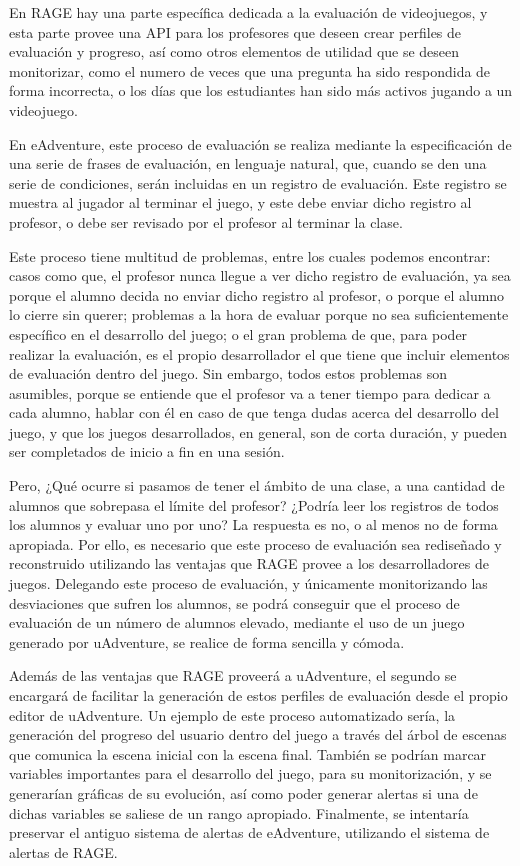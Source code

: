 En RAGE hay una parte específica dedicada a la evaluación de videojuegos, y esta parte provee una API para los profesores que deseen crear perfiles de evaluación y progreso, así como otros elementos de utilidad que se deseen monitorizar, como el numero de veces que una pregunta ha sido respondida de forma incorrecta, o los días que los estudiantes han sido más activos jugando a un videojuego.

En eAdventure, este proceso de evaluación se realiza mediante la especificación de una serie de frases de evaluación, en lenguaje natural, que, cuando se den una serie de condiciones, serán incluidas en un registro de evaluación. Este registro se muestra al jugador al terminar el juego, y este debe enviar dicho registro al profesor, o debe ser revisado por el profesor al terminar la clase.

Este proceso tiene multitud de problemas, entre los cuales podemos encontrar: casos como que, el profesor nunca llegue a ver dicho registro de evaluación, ya sea porque el alumno decida no enviar dicho registro al profesor, o porque el alumno lo cierre sin querer; problemas a la hora de evaluar porque no sea suficientemente específico en el desarrollo del juego; o el gran problema de que, para poder realizar la evaluación, es el propio desarrollador el que tiene que incluir elementos de evaluación dentro del juego. Sin embargo, todos estos problemas son asumibles, porque se entiende que el profesor va a tener tiempo para dedicar a cada alumno, hablar con él en caso de que tenga dudas acerca del desarrollo del juego, y que los juegos desarrollados, en general, son de corta duración, y pueden ser completados de inicio a fin en una sesión.

Pero, ¿Qué ocurre si pasamos de tener el ámbito de una clase, a una cantidad de alumnos que sobrepasa el límite del profesor? ¿Podría leer los registros de todos los alumnos y evaluar uno por uno? La respuesta es no, o al menos no de forma apropiada. Por ello, es necesario que este proceso de evaluación sea rediseñado y reconstruido utilizando las ventajas que RAGE provee a los desarrolladores de juegos. Delegando este proceso de evaluación, y únicamente monitorizando las desviaciones que sufren los alumnos, se podrá conseguir que el proceso de evaluación de un número de alumnos elevado, mediante el uso de un juego generado por uAdventure, se realice de forma sencilla y cómoda.

Además de las ventajas que RAGE proveerá a uAdventure, el segundo se encargará de facilitar la generación de estos perfiles de evaluación desde el propio editor de uAdventure. Un ejemplo de este proceso automatizado sería, la generación del progreso del usuario dentro del juego a través del árbol de escenas que comunica la escena inicial con la escena final. También se podrían marcar variables importantes para el desarrollo del juego, para su monitorización, y se generarían gráficas de su evolución, así como poder generar alertas si una de dichas variables se saliese de un rango apropiado. Finalmente, se intentaría preservar el antiguo sistema de alertas de eAdventure, utilizando el sistema de alertas de RAGE.

